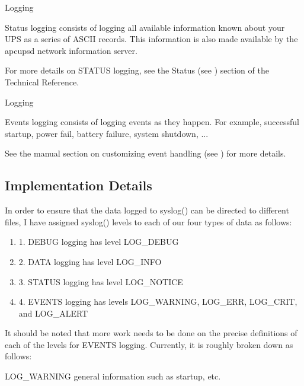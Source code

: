 {{{{{{{{{{{\smallSTATUS Logging}

Status logging consists of logging all available information known about your
UPS as a series of ASCII records. This information is also made available by
the apcupsd network information server.  

For more details on STATUS logging, see the Status (see 
) section of
the Technical Reference. 

{\smallEVENTS Logging}

Events logging consists of logging events as they happen. For example,
successful startup, power fail, battery failure, system shutdown, ...  

See the manual section on customizing event handling (see 
) for
more details. 

\label{Implementation-Details}

\subsection*{Implementation Details}

In order to ensure that the data logged to syslog() can be directed to
different files, I have assigned syslog() levels to each of our four types of
data as follows:  

\begin{enumerate}
\item 1. DEBUG logging has level LOG\_DEBUG  
\item 2. DATA logging has level LOG\_INFO  
\item 3. STATUS logging has level LOG\_NOTICE  
\item 4. EVENTS logging has levels LOG\_WARNING, LOG\_ERR, LOG\_CRIT, and
   LOG\_ALERT  
   \end{enumerate}

It should be noted that more work needs to be done on the precise definitions
of each of the levels for EVENTS logging. Currently, it is roughly broken down
as follows:  

LOG\_WARNING general information such as startup, etc.  

}}}}}}}}}}
